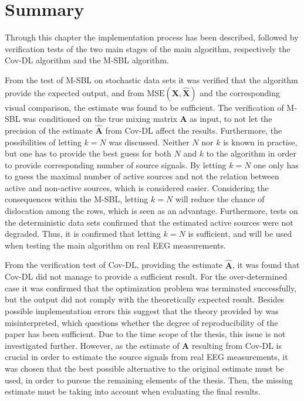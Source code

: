 \section{Summary}
Through this chapter the implementation process has been described, followed by verification tests of the two main stages of the main algorithm, respectively the Cov-DL algorithm and the M-SBL algorithm. 

From the test of M-SBL on stochastic data sets it was verified that the algorithm provide the expected output, and from $\text{MSE}(\mathbf{X}, \hat{\mathbf{X}})$ and the corresponding visual comparison, the estimate was found to be sufficient. 
The verification of M-SBL was conditioned on the true mixing matrix $\mathbf{A}$ as input, to not let the precision of the estimate $\hat{\mathbf{A}}$ from Cov-DL affect the results. 
Furthermore, the possibilities of letting $k = N$ was discussed. Neither $N$ nor $k$ is known in practise, but one has to provide the best guess for both $N$ and $k$ to the algorithm in order to provide corresponding number of source signals. 
By letting $k = N$ one only has to guess the maximal number of active sources and not the relation between active and non-active sources, which is considered easier. 
Considering the consequences within the M-SBL, letting $k = N$ will reduce the chance of dislocation among the rows, which is seen as an advantage. 
Furthermore, tests on the deterministic data sets confirmed that the estimated active sources were not degraded. 
Thus, it is confirmed that letting $k = N$ is sufficient, and will be used when testing the main algorithm on real EEG measurements. 

From the verification test of Cov-DL, providing the estimate $\hat{\mathbf{A}}$, it was found that Cov-DL did not manage to provide a sufficient result. 
For the over-determined case it was confirmed that the optimization problem was terminated successfully, but the output did not comply with the theoretically expected result. 
Besides possible implementation errors this suggest that the theory provided by \cite{phd2015} was misinterpreted, which questions whether the degree of reproducibility of the paper has been sufficient. 
Due to the time scope of the thesis, this issue is not investigated further. 
However, as the estimate of $\mathbf{A}$ resulting from Cov-DL is crucial in order to estimate the source signals from real EEG measurements, it was chosen that the best possible alternative to the original estimate must be used, in order to pursue the remaining elements of the thesis. 
Then, the missing estimate must be taking into account when evaluating the final results.

